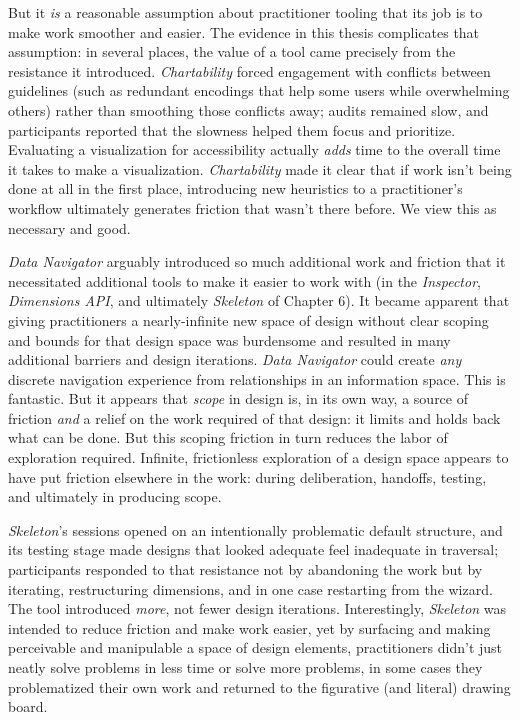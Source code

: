 \documentclass[12pt]{cmuthesis}
\begin{document}
But it \textit{is} a reasonable assumption about practitioner tooling that its job is to make work smoother and easier. The evidence in this thesis complicates that assumption: in several places, the value of a tool came precisely from the resistance it introduced. \textit{Chartability} forced engagement with conflicts between guidelines (such as redundant encodings that help some users while overwhelming others) rather than smoothing those conflicts away; audits remained slow, and participants reported that the slowness helped them focus and prioritize. Evaluating a visualization for accessibility actually \textit{adds} time to the overall time it takes to make a visualization. \textit{Chartability} made it clear that if work isn't being done at all in the first place, introducing new heuristics to a practitioner's workflow ultimately generates friction that wasn't there before. We view this as necessary and good.

\textit{Data Navigator} arguably introduced so much additional work and friction that it necessitated additional tools to make it easier to work with (in the \textit{Inspector}, \textit{Dimensions API}, and ultimately \textit{Skeleton} of Chapter 6). It became apparent that giving practitioners a nearly-infinite new space of design without clear scoping and bounds for that design space was burdensome and resulted in many additional barriers and design iterations. \textit{Data Navigator} could create \textit{any} discrete navigation experience from relationships in an information space. This is fantastic. But it appears that \textit{scope} in design is, in its own way, a source of friction \textit{and} a relief on the work required of that design: it limits and holds back what can be done. But this scoping friction in turn reduces the labor of exploration required. Infinite, frictionless exploration of a design space appears to have put friction elsewhere in the work: during deliberation, handoffs, testing, and ultimately in producing scope.

\textit{Skeleton}'s sessions opened on an intentionally problematic default structure, and its testing stage made designs that looked adequate feel inadequate in traversal; participants responded to that resistance not by abandoning the work but by iterating, restructuring dimensions, and in one case restarting from the wizard. The tool introduced \textit{more}, not fewer design iterations. Interestingly, \textit{Skeleton} was intended to reduce friction and make work easier, yet by surfacing and making perceivable and manipulable a space of design elements, practitioners didn't just neatly solve problems in less time or solve more problems, in some cases they problematized their own work and returned to the figurative (and literal) drawing board.
\end{document}
